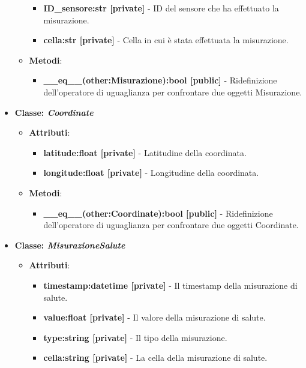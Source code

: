\begin{itemize}
\begin{itemize}
\begin{itemize}
        \item \textbf{ID\_sensore:str [private]} - ID del sensore che ha effettuato la misurazione.
        \item \textbf{cella:str [private]} - Cella in cui è stata effettuata la misurazione.
    \end{itemize}
    \item   \textbf{Metodi}: 
    \begin{itemize}
        \item \textbf{\_\_eq\_\_(other:Misurazione):bool [public]} - Ridefinizione dell'operatore di uguaglianza per confrontare due oggetti Misurazione.
    \end{itemize}
\end{itemize}
    \item\textbf{Classe: \textit{Coordinate}}
    \begin{itemize}
        \item    \textbf{Attributi}: 
    \begin{itemize}
        \item \textbf{latitude:float [private]} - Latitudine della coordinata.
        \item \textbf{longitude:float [private]} - Longitudine della coordinata.
    \end{itemize}
    \item     \textbf{Metodi}: 
    \begin{itemize}
        \item \textbf{\_\_eq\_\_(other:Coordinate):bool [public]} - Ridefinizione dell'operatore di uguaglianza per confrontare due oggetti Coordinate.
    \end{itemize}
\end{itemize}
\item\textbf{Classe: \textit{MisurazioneSalute}}
    \begin{itemize}
    \item\textbf{Attributi}:
        \begin{itemize}
        \item \textbf{timestamp:datetime [private]} - Il timestamp della misurazione di salute.
        \item \textbf{value:float [private]} - Il valore della misurazione di salute.
        \item \textbf{type:string [private]} - Il tipo della misurazione.
        \item \textbf{cella:string [private]} - La cella della misurazione di salute.
    \end{itemize}

\end{itemize}
\end{itemize}
